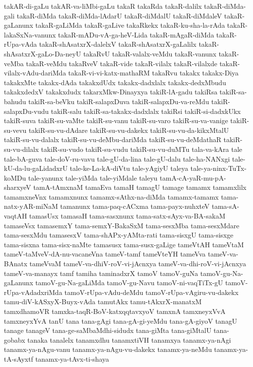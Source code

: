 {takAR-di-gaLu
takAR-va-liMbi-gaLu
takaR
takaRda
takaR-dalilx
takaR-diMda-gali
takaR-diMda
takaR-diMda-lAdarU
takaR-diMdalU
takaR-diMdaleV
takaR-gaLanunx
takaR-gaLiMda
takaR-gaLive
takaRkekx
takaR-ku-sha-la-rAda
takaR-lakaSxNa-vanunx
takaR-mADu-vA-ga-heV-Lida
takaR-mAgaR-diMda
takaR-rUpa-vAda
takaR-shAsatxrX-dalelxV
takaR-shAsatxrX-gaLalilx
takaR-shAsatxrX-gaLo-Da-neyU
takaRvU
takaR-valalx-veMdu
takaR-vanunx
takaR-veMba
takaR-veMdu
takaRveV
takaR-vide
takaR-vilalx
takaR-vilalxde
takaR-vilalx-vAdu-dariMda
takaR-vi-vi-katx-mathaRM
takaRvu
takakx
takakx-Diya
takakxMte
takakx-dAda
takakxdUdx
takakx-dadxlalx
takakx-dedxMbudu
takakxdedxV
takakxdudx
takarxMkw-Dinayxya
takiR-lA-gadu
takiRsa
takiR-sa-bahudu
takiR-sa-beVku
takiR-salapxDuva
takiR-salapxDu-va-reMdu
takiR-salapxDu-vudu
takiR-salu
takiR-sa-takakx-dadxlalx
takiRsi
takiR-si-dadxkUkx
takiR-suva
takiR-su-vaMte
takiR-su-vanu
takiR-su-varo
takiR-su-va-vanige
takiR-su-vevu
takiR-su-vu-dAdare
takiR-su-vu-dakekx
takiR-su-vu-da-kikxMtalU
takiR-su-vu-dalalx
takiR-su-vu-deMbu-dariMda
takiR-su-vu-deMdathaR
takiR-su-vu-dilalx
takiR-su-vudo
takiR-su-vudu
takiR-su-vu-duMTu
tala-va-kAra
tale
tale-bA-guva
tale-doV-ru-vavu
tale-gU-da-lina
tale-gU-dalu
tale-ha-NANxgi
tale-kU-da-lu-gaLidadxrU
tale-ke-La-kA-diVtu
tale-yAgiyU
taleya
tale-ya-ninx-TuTx-koMDu
tale-yanunx
tale-yiMda
tale-yiMdale
taleyu
tamA-cA-yaR-mu-pA-sharxyeV
tamA-tAmxnaM
tamaEva
tamaH
tamagU
tamage
tamamx
tamamxlilx
tamamxneVnx
tamamxnunx
tamamx-sAthx-na-diMda
tamamx-tamamx
tama-natx-yAR-miNaM
tamanunx
tama-paq-cACxma
tama-payx-nuhxteV
tama-sA-vaqtAH
tamasUsx
tamasaH
tama-sasxnunx
tama-satx-sAyx-va-BA-sakaM
tamaseVsx
tamasemxY
tama-semxY-BakaSxM
tama-sesxMba
tama-sesxMdare
tama-sesxMdu
tamasesxV
tama-shAPx-yAMta-rati
tama-sisxgU
tama-sisxge
tama-sisxna
tama-sisx-naMte
tamasusx
tama-susx-gaLige
tameVtAH
tameVtaM
tameV-taMveV-dA-nu-vacaneVna
tameV-tamf
tameVteYH
tameVva
tameV-va-BAnatx
tameVvaM
tameV-va-dhiV-roV-vi-jAcnxya
tameV-va-dhi-roV-vi-jAcnxya
tameV-va-manayx
tamf
tamiha
taminadxrX
tamoV
tamoV-guNa
tamoV-gu-Na-gaLanunx
tamoV-gu-Na-gaLiMda
tamoV-gu-Navu
tamoV-ni-vaqTiTx-gU
tamoV-rUpa-vAdadxriMda
tamoV-rUpa-vAdu-deMdu
tamoV-rUpa-vAgiru-vu-dakekx
tamu-diV-kASxyX-Buyx-vAda
tamutAkx
tamu-tAkxrX-manatxM
tamxdhamoVR
tamxka-taqR-BoV-katxqqtavxyoV
tamxnA
tamxneyxVvA
tamxneyxYvA
tanU
tana
tana-gAgi
tana-gA-gi-yeMdu
tana-gA-giyoV
tanagU
tanage
tanageV
tana-ge-saMbaMdhi-sidudx
tana-giMta
tana-giMtalU
tana-gobabx
tanaka
tanalelx
tanamxdhu
tanamxtiVH
tanamxya
tanamx-ya-nAgi
tanamx-ya-nAgu-vanu
tanamx-ya-nAgu-vu-dakekx
tanamx-ya-neMdu
tanamx-ya-tA-sAyxtf
tanamx-ya-tAvx-ti-shaya
}
